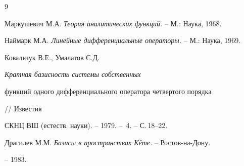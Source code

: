 \begin{thebibliography}{9} 


 




Маркушевич М.А. {\em Теория аналитических функций.} -- М.: Наука, 1968. 


 




Наймарк М.А. {\em Линейные дифференциальные операторы.} -- М.: Наука, 1969. 


 




Ковальчук В.Е., Умалатов С.Д. {\em Кратная базисность системы собственных 


функций одного дифференциального оператора четвертого порядка} // Известия 


СКНЦ ВШ (естеств. науки). -- 1979. -- \No\,4. -- С.\,18--22. 


 




Драгилев М.М. {\em Базисы в пространствах К\"ете.} -- Ростов-на-Дону. 


-- 1983. 


 


\end{thebibliography} 


 


\vskip 1cm 


 








 


 


 


